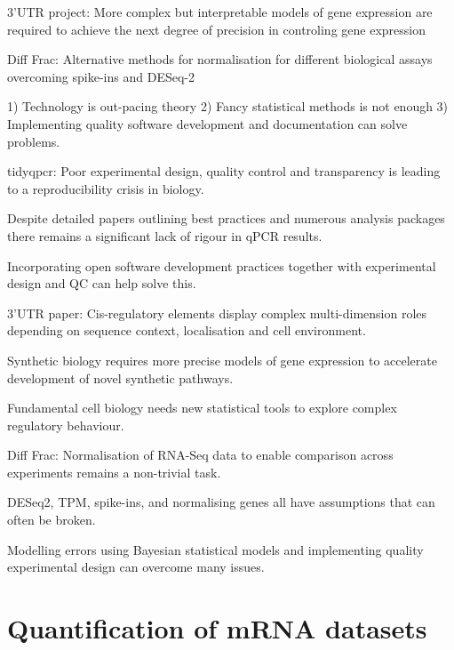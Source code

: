 \documentclass{SBCbookchapter}
\begin{document}
3'UTR project: More complex but interpretable models of gene expression are required to achieve the next degree of precision in controling gene expression

Diff Frac: Alternative methods for normalisation for different biological assays overcoming spike-ins and DESeq-2

1) Technology is out-pacing theory
2) Fancy statistical methods is not enough
3) Implementing quality software development and documentation can solve problems.

tidyqpcr: Poor experimental design, quality control and transparency is leading to a reproducibility crisis in biology.

Despite detailed papers outlining best practices and numerous analysis packages there remains a significant lack of rigour in qPCR results.

Incorporating open software development practices together with experimental design and QC can help solve this.

3’UTR paper: Cis-regulatory elements display complex multi-dimension roles depending on sequence context, localisation and cell environment.

Synthetic biology requires more precise models of gene expression to accelerate development of novel synthetic pathways.

Fundamental cell biology needs new statistical tools to explore complex regulatory behaviour.

Diff Frac: Normalisation of RNA-Seq data to enable comparison across experiments remains a non-trivial task. 

DESeq2, TPM, spike-ins, and normalising genes all have assumptions that can often be broken.

Modelling errors using Bayesian statistical models and implementing quality experimental design can overcome many issues.

\section{Quantification of mRNA datasets}
\end{document}
